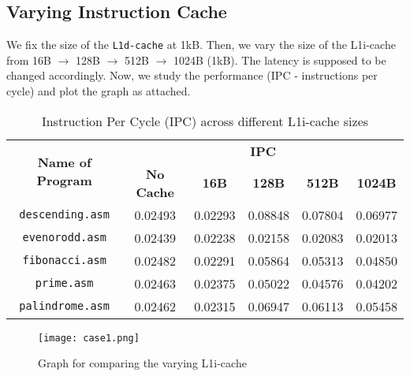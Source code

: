 \documentclass{article}
\begin{document}
\subsection{Varying Instruction Cache}
We fix the size of the \texttt{L1d-cache} at 1kB. Then, we vary the size of the L1i-cache from 16B $\rightarrow$ 128B $\rightarrow$ 512B $\rightarrow$ 1024B (1kB). The latency is supposed to be changed accordingly. Now, we study the performance (IPC - instructions per cycle) and plot the graph as attached.
\begin{table}[h!]
    \centering
    \begin{tabular}{|c|c|c|c|c|c|}
        \hline
        \multirow{2}{*}{\textbf{Name of Program}} & \multicolumn{5}{c|}{\textbf{IPC}} \\
        \cline{2-6}
        & \textbf{No Cache} & \textbf{16B} & \textbf{128B} & \textbf{512B} & \textbf{1024B} \\
        \hline
        \texttt{descending.asm} & 0.02493 & 0.02293 & 0.08848 & 0.07804 & 0.06977 \\
        \hline
        \texttt{evenorodd.asm}  & 0.02439 & 0.02238 & 0.02158 & 0.02083 & 0.02013 \\
        \hline
        \texttt{fibonacci.asm}  & 0.02482 & 0.02291 & 0.05864 & 0.05313 & 0.04850 \\
        \hline
        \texttt{prime.asm}      & 0.02463 & 0.02375 & 0.05022 & 0.04576 & 0.04202 \\  %
        \hline
        \texttt{palindrome.asm} & 0.02462 & 0.02315 & 0.06947 & 0.06113 & 0.05458 \\
        \hline
    \end{tabular}
    \caption{Instruction Per Cycle (IPC) across different L1i-cache sizes}
    \label{tab:ipc_results}
\end{table}

\begin{figure}[h]
    \centering
    \texttt{[image: case1.png]}
    \caption{Graph for comparing the varying L1i-cache}
    \label{fig:graph1}
\end{figure}
\end{document}
